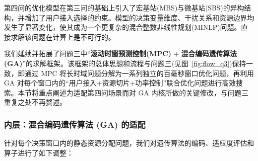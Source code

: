 第四问的优化模型在第三问的基础上引入了宏基站(MBS)与微基站(SBS)的异构结构，并增加了用户接入选择的约束。模型的决策变量维度、干扰关系和资源边界均发生了显著变化，使其成为一个更复杂的混合整数非线性规划(MINLP)问题。直接求解该问题在计算上是不可行的。

我们延续并拓展了问题三中“\textbf{滚动时窗预测控制(MPC)} + \textbf{混合编码遗传算法(GA)}”的求解框架。该框架的总体思想和流程与问题三(见图~\ref{fig:flow_q3})保持一致，即通过 MPC 将长时域问题分解为一系列独立的百毫秒窗口优化问题，再利用 GA 对每个窗口内的“用户接入+资源切片+功率控制”联合优化问题进行高效搜索。本节将重点阐述为适配第四问场景而对 GA 内核所做的关键修改，与问题三重复之处不再赘述。

\subsubsection{内层：混合编码遗传算法 (GA) 的适配}

针对每个决策窗口内的静态资源分配问题，我们对遗传算法的编码、适应度评估和算子进行了如下调整：

